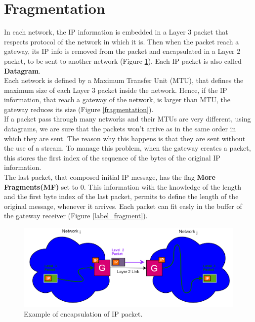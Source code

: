 \section{Fragmentation}\label{fragment_section}
In each network, the IP information is embedded in a Layer 3 packet that respects protocol of the network in which it is. Then when the packet reach a gateway, its IP info is removed from the packet and encapsulated in a Layer 2 packet, to be sent to another network (Figure \ref{packets}). Each IP packet is also called \textbf{Datagram}.\\
Each network is defined by a Maximum Transfer Unit (MTU), that defines the maximum size of each Layer 3 packet inside the network. Hence, if the IP information, that reach a gateway of the network, is larger than MTU, the gateway reduces its size (Figure \ref{fragmentation}).\\
If a packet pass through many networks and their MTUs are very different, using datagrams, we are sure that the packets won't arrive as in the same order in which they are sent. The reason why this happens is that they are sent without the use of a stream. To manage this problem, when the gateway creates a packet, this stores the first index of the sequence of the bytes of the original IP information.\\
The last packet, that composed initial IP message, has the flag \textbf{More Fragments(MF)} set to 0. This information with the knowledge of the length and the first byte index of the last packet, permits to define the length of the original message, whenever it arrives. Each packet can fit easly in the buffer of the gateway receiver (Figure \ref{label_fragment}).
\begin{figure}[h]
\centering
\includegraphics[scale=0.5]{Images/IP/packets}
\caption{\footnotesize{Example of encapsulation of IP packet.}}\label{packets}
\end{figure}
